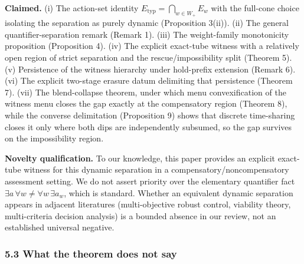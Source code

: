 \documentclass[11pt]{article}
\begin{document}
\textbf{Claimed.} (i) The action-set identity
\(E_{\mathrm{typ}} = \bigcap_{w \in W_+} E_w\) with the full-cone choice
isolating the separation as purely dynamic (Proposition 3(ii)). (ii) The
general quantifier-separation remark (Remark 1). (iii) The weight-family
monotonicity proposition (Proposition 4). (iv) The explicit exact-tube
witness with a relatively open region of strict separation and the
rescue/impossibility split (Theorem 5). (v) Persistence of the witness
hierarchy under hold-prefix extension (Remark 6). (vi) The explicit
two-stage erasure datum delimiting that persistence (Theorem 7). (vii)
The blend-collapse theorem, under which menu convexification of the
witness menu closes the gap exactly at the compensatory region (Theorem
8), while the converse delimitation (Proposition 9) shows that discrete
time-sharing closes it only where both dips are independently subsumed,
so the gap survives on the impossibility region.

\textbf{Novelty qualification.} To our knowledge, this paper provides an
explicit exact-tube witness for this dynamic separation in a
compensatory/noncompensatory assessment setting. We do not assert
priority over the elementary quantifier fact
\(\exists a\, \forall w \neq \forall w\, \exists a_w\), which is
standard. Whether an equivalent dynamic separation appears in adjacent
literatures (multi-objective robust control, viability theory,
multi-criteria decision analysis) is a bounded absence in our review,
not an established universal negative.

\subsubsection{5.3 What the theorem does not
say}\label{what-the-theorem-does-not-say}
\end{document}
